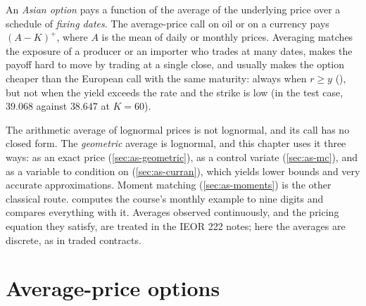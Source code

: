 \providecommand{\Corr}{\operatorname{Corr}}

An \emph{Asian option} pays a function of the average of the underlying price over a schedule
of \emph{fixing dates}. The average-price call on oil or on a currency pays $(A-K)^+$, where
$A$ is the mean of daily or monthly prices. Averaging matches the exposure of a producer or an
importer who trades at many dates, makes the payoff hard to move by trading at a single
close, and usually makes the option cheaper than the European call with the same maturity:
always when $r\ge y$ (), but not when the yield exceeds the rate and the
strike is low (in the test case, $39.068$ against $38.647$ at $K=60$).

The arithmetic average of lognormal prices is not lognormal, and its call has no closed
form. The \emph{geometric} average is lognormal, and this chapter uses it three ways: as an
exact price (\cref{sec:as-geometric}), as a control variate (\cref{sec:as-mc}), and as a
variable to condition on (\cref{sec:as-curran}), which yields lower bounds and very accurate
approximations. Moment matching (\cref{sec:as-moments}) is the other classical route.
 computes the course's monthly example to nine digits and compares
everything with it. Averages observed continuously, and the pricing equation they satisfy,
are treated in the IEOR 222 notes; here the averages are discrete, as in traded contracts.

\section{Average-price options}\label{sec:as-payoffs}

